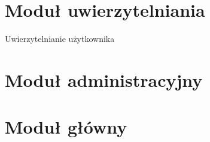 \section{Moduł uwierzytelniania}

\begin{class}{Uwierzytelnianie użytkownika}
\end{class}

\section{Moduł administracyjny}

\section{Moduł główny}

